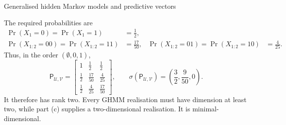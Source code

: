 \begin{exercise}[Extension]{Generalised hidden Markov models and predictive vectors}
\begin{solution}
\begin{parts}
\begin{subparts}
          \item The required probabilities are
            \[
              \begin{aligned}
                \Pr(X_1=0)=\Pr(X_1=1)&=\frac12,\\
                \Pr(X_{1:2}=00)=\Pr(X_{1:2}=11)&=\frac{17}{50},&
                \Pr(X_{1:2}=01)=\Pr(X_{1:2}=10)&=\frac4{25}.
              \end{aligned}
            \]
            Thus, in the order $(\emptyset,0,1)$,
            \[
              \mathsf P_{\mathcal U,\mathcal V}
                =
                \begin{bmatrix}
                  1&\tfrac12&\tfrac12\\
                  \tfrac12&\tfrac{17}{50}&\tfrac4{25}\\
                  \tfrac12&\tfrac4{25}&\tfrac{17}{50}
                \end{bmatrix},
              \qquad
              \sigma(\mathsf P_{\mathcal U,\mathcal V})
                =\left(\frac32,\frac9{50},0\right).
            \]
            It therefore has rank two. Every GHMM realisation must have
            dimension at least two, while part (c) supplies a
            two-dimensional realisation. It is minimal-dimensional.
        \end{subparts}

    \end{parts}
  \end{solution}
\end{exercise}
